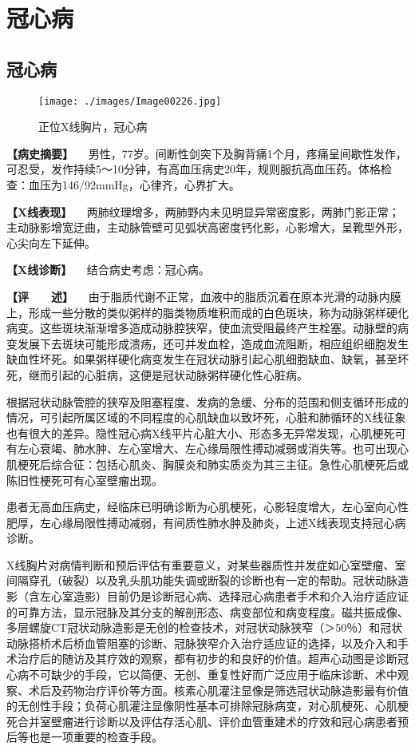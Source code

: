 \section{冠心病}

\subsection{冠心病}

\begin{figure}[!htbp]
 \centering
 \texttt{[image: ./images/Image00226.jpg]}
 \captionsetup{justification=centering}
 \caption{正位X线胸片，冠心病}
 \label{fig4-6-1}
  \end{figure} 

\textbf{【病史摘要】}
　男性，77岁。间断性剑突下及胸背痛1个月，疼痛呈间歇性发作，可忍受，发作持续5～10分钟，有高血压病史20年，规则服抗高血压药。体格检查：血压为146/92mmHg，心律齐，心界扩大。

\textbf{【X线表现】}
　两肺纹理增多，两肺野内未见明显异常密度影，两肺门影正常；主动脉影增宽迂曲，主动脉管壁可见弧状高密度钙化影，心影增大，呈靴型外形，心尖向左下延伸。

\textbf{【X线诊断】} 　结合病史考虑：冠心病。

\textbf{【评　　述】}
　由于脂质代谢不正常，血液中的脂质沉着在原本光滑的动脉内膜上，形成一些分散的类似粥样的脂类物质堆积而成的白色斑块，称为动脉粥样硬化病变。这些斑块渐渐增多造成动脉腔狭窄，使血流受阻最终产生栓塞。动脉壁的病变发展下去斑块可能形成溃疡，还可并发血栓，造成血流阻断，相应组织细胞发生缺血性坏死。如果粥样硬化病变发生在冠状动脉引起心肌细胞缺血、缺氧，甚至坏死，继而引起的心脏病，这便是冠状动脉粥样硬化性心脏病。

根据冠状动脉管腔的狭窄及阻塞程度、发病的急缓、分布的范围和侧支循环形成的情况，可引起所属区域的不同程度的心肌缺血以致坏死，心脏和肺循环的X线征象也有很大的差异。隐性冠心病X线平片心脏大小、形态多无异常发现，心肌梗死可有左心衰竭、肺水肿、左心室增大、左心缘局限性搏动减弱或消失等。也可出现心肌梗死后综合征：包括心肌炎、胸膜炎和肺实质炎为其三主征。急性心肌梗死后或陈旧性梗死可有心室壁瘤出现。

患者无高血压病史，经临床已明确诊断为心肌梗死，心影轻度增大，左心室向心性肥厚，左心缘局限性搏动减弱，有间质性肺水肿及肺炎，上述X线表现支持冠心病诊断。

X线胸片对病情判断和预后评估有重要意义，对某些器质性并发症如心室壁瘤、室间隔穿孔（破裂）以及乳头肌功能失调或断裂的诊断也有一定的帮助。冠状动脉造影（含左心室造影）目前仍是诊断冠心病、选择冠心病患者手术和介入治疗适应证的可靠方法，显示冠脉及其分支的解剖形态、病变部位和病变程度。磁共振成像、多层螺旋CT冠状动脉造影是无创的检查技术，对冠状动脉狭窄（＞50％）和冠状动脉搭桥术后桥血管阻塞的诊断、冠脉狭窄介入治疗适应证的选择，以及介入和手术治疗后的随访及其疗效的观察，都有初步的和良好的价值。超声心动图是诊断冠心病不可缺少的手段，它以简便、无创、重复性好而广泛应用于临床诊断、术中观察、术后及药物治疗评价等方面。核素心肌灌注显像是筛选冠状动脉造影最有价值的无创性手段；负荷心肌灌注显像阴性基本可排除冠脉病变，对心肌梗死、心肌梗死合并室壁瘤进行诊断以及评估存活心肌、评价血管重建术的疗效和冠心病患者预后等也是一项重要的检查手段。

